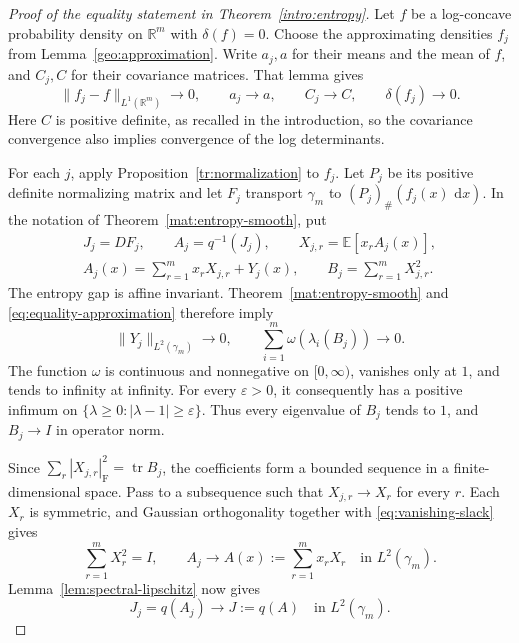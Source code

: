 \documentclass[11pt]{article}
\theoremstyle{definition}
\theoremstyle{remark}
\numberwithin{equation}{section}
\begin{document}
\begin{proof}[Proof of the equality statement in Theorem~\ref{intro:entropy}]
Let $f$ be a log-concave probability density on $\mathbb R^m$ with
$\delta(f)=0$.  Choose the approximating densities $f_j$ from
Lemma~\ref{geo:approximation}.  Write $a_j,a$ for their means and the mean of
$f$, and $C_j,C$ for their covariance matrices.  That lemma gives
\begin{equation}\label{eq:equality-approximation}
  \lVert f_j-f\rVert_{L^1(\mathbb R^m)}\longrightarrow0,\qquad
  a_j\longrightarrow a,\qquad C_j\longrightarrow C,\qquad
  \delta(f_j)\longrightarrow0.
\end{equation}
Here $C$ is positive definite, as recalled in the introduction, so the
covariance convergence also implies convergence of the log determinants.

For each $j$, apply Proposition~\ref{tr:normalization} to $f_j$.
Let $P_j$ be its positive definite normalizing matrix and let $F_j$
transport $\gamma_m$ to $(P_j)_\#(f_j(x)\,\,\mathrm d x)$.  In the notation
of Theorem~\ref{mat:entropy-smooth}, put
\[
 \begin{gathered}
  J_j=DF_j,\qquad A_j=q^{-1}(J_j),\qquad
  X_{j,r}=\mathbb E[x_rA_j(x)],\\
  A_j(x)=\sum_{r=1}^m x_rX_{j,r}+Y_j(x),\qquad
  B_j=\sum_{r=1}^m X_{j,r}^2.
 \end{gathered}
\]
The entropy gap is affine invariant.  Theorem~\ref{mat:entropy-smooth} and
\eqref{eq:equality-approximation} therefore imply
\begin{equation}\label{eq:vanishing-slack}
  \lVert Y_j\rVert_{L^2(\gamma_m)}\longrightarrow0,
  \qquad
  \sum_{i=1}^m \omega(\lambda_i(B_j))\longrightarrow0.
\end{equation}
The function $\omega$ is continuous and nonnegative on $[0,\infty)$,
vanishes only at $1$, and tends to infinity at infinity.
For every $\varepsilon>0$, it consequently has a positive infimum on
$\{\lambda\ge0:|\lambda-1|\ge\varepsilon\}$.  Thus every eigenvalue
of $B_j$ tends to $1$, and $B_j\to I$ in operator norm.

Since $\sum_r|X_{j,r}|_{\mathrm F}^2=\operatorname{tr} B_j$, the coefficients form
a bounded sequence in a finite-dimensional space.  Pass to a subsequence
such that $X_{j,r}\to X_r$ for every $r$.  Each $X_r$ is symmetric,
and Gaussian orthogonality together with \eqref{eq:vanishing-slack}
gives
\begin{equation}\label{eq:linear-field-limit}
  \sum_{r=1}^mX_r^2=I,\qquad
  A_j\longrightarrow A(x):=\sum_{r=1}^m x_rX_r
      \quad\text{in }L^2(\gamma_m).
\end{equation}
Lemma~\ref{lem:spectral-lipschitz} now gives
\begin{equation}\label{eq:jacobian-limit}
  J_j=q(A_j)\longrightarrow J:=q(A)
      \quad\text{in }L^2(\gamma_m).
\end{equation}


\end{proof}
\end{document}
